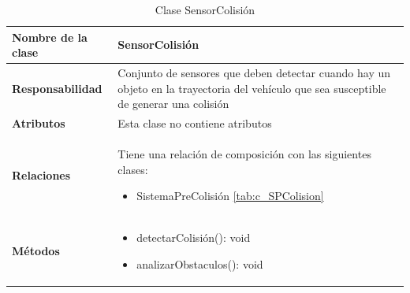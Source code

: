 \begin{table}[h]
\begin{center}
\begin{tabular}{p{} p{11cm}}
\textbf{Nombre de la clase} &  SensorColisión\\ \hline \hline
\textbf{Responsabilidad} &  Conjunto de sensores que deben detectar cuando hay un objeto en la trayectoria del vehículo que sea susceptible de generar una colisión  \\ \hline
\textbf{Atributos} & Esta clase no contiene atributos\\ \hline
\textbf{Relaciones} & \par Tiene una relación de composición con las siguientes clases:
                      \begin{itemize}
                        \item SistemaPreColisión \ref{tab:c_SPColision}
                      \end{itemize}

                      \\ \hline

\textbf{Métodos} &  \begin{itemize}
                      \item detectarColisión(): void
                      \item analizarObstaculos(): void
                    \end{itemize}\\ \hline
\end{tabular}
\caption{Clase SensorColisión}
\label{tab:c_SensorC}
\end{center}
\end{table}








